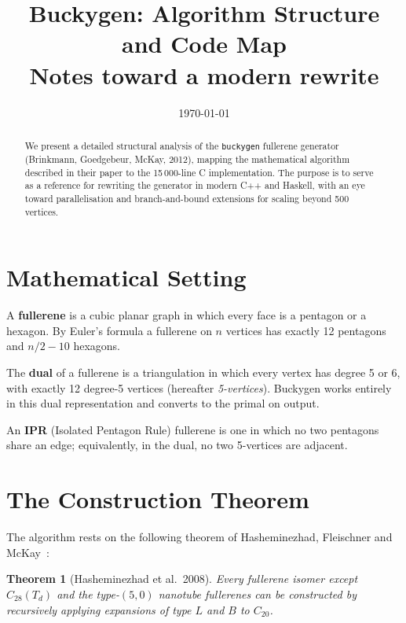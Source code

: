 \documentclass[11pt,a4paper]{article}
\title{Buckygen: Algorithm Structure and Code Map\\[6pt]
\large Notes toward a modern rewrite}
\author{}
\date{\today}
\newtheorem{theorem}{Theorem}[section]
\theoremstyle{definition}
\begin{document}
\maketitle

\begin{abstract}
We present a detailed structural analysis of the \texttt{buckygen} fullerene
generator (Brinkmann, Goedgebeur, McKay, 2012), mapping the mathematical
algorithm described in their paper to the 15\,000-line C implementation.
The purpose is to serve as a reference for rewriting the generator in
modern C++ and Haskell, with an eye toward parallelisation and
branch-and-bound extensions for scaling beyond 500 vertices.
\end{abstract}

\tableofcontents
\newpage

\section{Mathematical Setting}

A \textbf{fullerene} is a cubic planar graph in which every face is a
pentagon or a hexagon. By Euler's formula a fullerene on $n$ vertices
has exactly 12 pentagons and $n/2 - 10$ hexagons.

The \textbf{dual} of a fullerene is a triangulation in which every vertex
has degree 5 or 6, with exactly 12 degree-5 vertices (hereafter
\emph{5-vertices}).  Buckygen works entirely in this dual
representation and converts to the primal on output.

An \textbf{IPR} (Isolated Pentagon Rule) fullerene is one in which no
two pentagons share an edge; equivalently, in the dual, no two
5-vertices are adjacent.

\section{The Construction Theorem}

The algorithm rests on the following theorem of Hasheminezhad, Fleischner
and McKay~\cite{hasheminezhad_08}:

\begin{theorem}[Hasheminezhad et al.\ 2008]\label{thm:construction}
Every fullerene isomer except $C_{28}(T_d)$ and the type-$(5,0)$
nanotube fullerenes can be constructed by recursively applying
expansions of type $L$ and $B$ to $C_{20}$.
\end{theorem}
\end{document}
